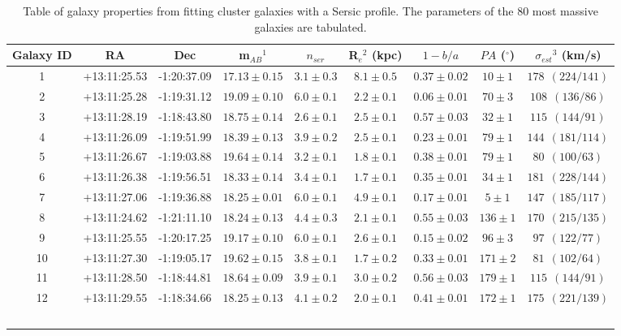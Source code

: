 \documentclass[useAMS,usenatbib]{mn2e}
\begin{document}
\begin{table}
  \caption{Table of galaxy properties from fitting cluster galaxies
  with a Sersic profile. The parameters of the 80 most massive
  galaxies are tabulated.}
  \begin{tabular}{ccccccccc}
    \hline
    Galaxy ID &  RA & Dec & m$_{AB}$$^1$ & $n_{ser}$& R$_e$$^2$ (kpc) & $1-b/a$& $PA$ ($^\circ$) & $\sigma_{est}$$^3$ (km/s)\\
    \hline
    \hline
         1 & +13:11:25.53 & -1:20:37.09 & $17.13\pm0.15$ & $3.1\pm0.3$ & $8.1\pm0.5$ & $0.37\pm0.02$ & $ 10\pm1$ & $178  ~~(224/141)$ \\
         2 & +13:11:25.28 & -1:19:31.12 & $19.09\pm0.10$ & $6.0\pm0.1$ & $2.2\pm0.1$ & $0.06\pm0.01$ & $ 70\pm3$ & $108  ~~(136/86)$ \\
         3 & +13:11:28.19 & -1:18:43.80 & $18.75\pm0.14$ & $2.6\pm0.1$ & $2.5\pm0.1$ & $0.57\pm0.03$ & $ 32\pm1$ & $115  ~~(144/91)$ \\
         4 & +13:11:26.09 & -1:19:51.99 & $18.39\pm0.13$ & $3.9\pm0.2$ & $2.5\pm0.1$ & $0.23\pm0.01$ & $ 79\pm1$ & $144  ~~(181/114)$ \\
         5 & +13:11:26.67 & -1:19:03.88 & $19.64\pm0.14$ & $3.2\pm0.1$ & $1.8\pm0.1$ & $0.38\pm0.01$ & $ 79\pm1$ & $ 80  ~~(100/63)$ \\
         6 & +13:11:26.38 & -1:19:56.51 & $18.33\pm0.14$ & $3.4\pm0.1$ & $1.7\pm0.1$ & $0.35\pm0.01$ & $ 34\pm1$ & $181  ~~(228/144)$ \\
         7 & +13:11:27.06 & -1:19:36.88 & $18.25\pm0.01$ & $6.0\pm0.1$ & $4.9\pm0.1$ & $0.17\pm0.01$ & $  5\pm1$ & $147  ~~(185/117)$ \\
         8 & +13:11:24.62 & -1:21:11.10 & $18.24\pm0.13$ & $4.4\pm0.3$ & $2.1\pm0.1$ & $0.55\pm0.03$ & $136\pm1$ & $170  ~~(215/135)$ \\
         9 & +13:11:25.55 & -1:20:17.25 & $19.17\pm0.10$ & $6.0\pm0.1$ & $2.6\pm0.1$ & $0.15\pm0.02$ & $ 96\pm3$ & $ 97  ~~(122/77)$ \\
        10 & +13:11:27.30 & -1:19:05.17 & $19.62\pm0.15$ & $3.8\pm0.1$ & $1.7\pm0.2$ & $0.33\pm0.01$ & $171\pm2$ & $ 81  ~~(102/64)$ \\
        11 & +13:11:28.50 & -1:18:44.81 & $18.64\pm0.09$ & $3.9\pm0.1$ & $3.0\pm0.2$ & $0.56\pm0.03$ & $179\pm1$ & $115  ~~(144/91)$ \\
        12 & +13:11:29.55 & -1:18:34.66 & $18.25\pm0.13$ & $4.1\pm0.2$ & $2.0\pm0.1$ & $0.41\pm0.01$ & $172\pm1$ & $175  ~~(221/139)$ \\
$$
\end{tabular}
\end{table}
\end{document}
